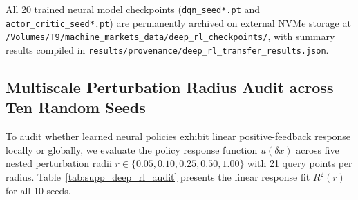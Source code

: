 \documentclass[11pt,a4paper]{article}
\theoremstyle{definition}\newtheorem{definition}[theorem]{Definition}
\theoremstyle{remark}\newtheorem{remark}[theorem]{Remark}
\begin{document}
All 20 trained neural model checkpoints (\texttt{dqn\_seed*.pt} and \texttt{actor\_critic\_seed*.pt}) are permanently archived on external NVMe storage at \nolinkurl{/Volumes/T9/machine_markets_data/deep_rl_checkpoints/}, with summary results compiled in \nolinkurl{results/provenance/deep_rl_transfer_results.json}.

\subsection{Multiscale Perturbation Radius Audit across Ten Random Seeds}
\label{sec:supp_deep_rl_jacobian}
To audit whether learned neural policies exhibit linear positive-feedback response locally or globally, we evaluate the policy response function $u(\delta x)$ across five nested perturbation radii $r \in \{0.05, 0.10, 0.25, 0.50, 1.00\}$ with 21 query points per radius. Table~\ref{tab:supp_deep_rl_audit} presents the linear response fit $R^2(r)$ for all 10 seeds.
\end{document}
